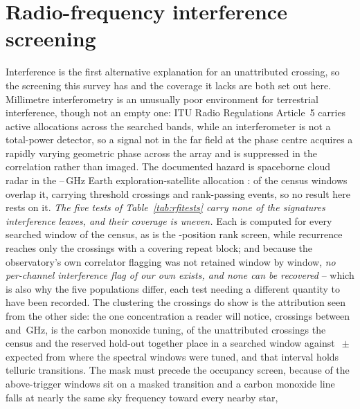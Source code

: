 \section{Radio-frequency interference screening}
\label{app:rfi}

Interference is the first alternative explanation for an unattributed
crossing, so the screening this survey has and the coverage it lacks are both
set out here. Millimetre interferometry is an unusually poor environment for
terrestrial interference, though not an empty one: ITU Radio Regulations
Article~5 \citep{ITU2024} carries active allocations across the searched
bands, while an interferometer is not a total-power detector, so a signal not
in the far field at the phase centre acquires a rapidly varying geometric
phase across the array and is suppressed in the correlation rather than
imaged. The documented hazard is spaceborne cloud radar in the
\RadarLo--\RadarHi\,GHz Earth exploration-satellite allocation
\citep{CloudSat2002,EarthCARE2023,ALMAMemo504}: \RadarNWin{} of the
\RadarNTot{} census windows overlap it, carrying \RadarNCross{} threshold
crossings and \RadarNStage{} rank-passing events, so no result here rests on
it. \emph{The five tests of Table~\ref{tab:rfitests} carry none of the signatures
interference leaves, and their coverage is uneven.} Each is computed for every
searched window of the census, as is the \NCtrl-position rank screen, while
recurrence reaches only the crossings with a covering repeat block; and
because the observatory's own correlator flagging was not retained window by
window, \emph{no per-channel interference flag of our own exists, and none can
be recovered} -- which is also why the five populations differ, each test
needing a different quantity to have been recorded. The clustering the
crossings do show is the attribution seen from the other side: the one
concentration a reader will notice, \TlBandAll{} crossings between
\TlBandLo{} and \TlBandHi\,GHz, is the carbon monoxide tuning, \TlBandObs{} of
the \TlBandNSub{} unattributed crossings the census and the reserved hold-out
together place in a searched window against
\TlBandNull$\,\pm\,$\TlBandNullSd{} expected from where the spectral windows
were tuned, and that interval holds \TlBandNLine{} telluric transitions. The
mask must precede the occupancy screen, because \RfiOccMaskN{} of the
\RfiOccSigN{} above-trigger windows sit on a masked transition and a carbon
monoxide line falls at nearly the same sky frequency toward every nearby star,
